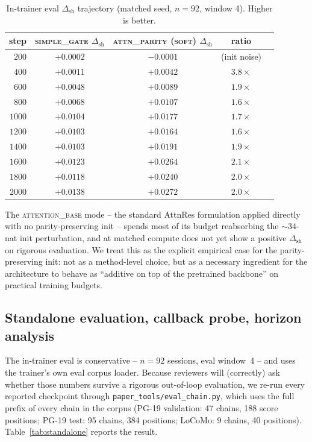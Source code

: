 \documentclass{article}
\newcommand{\dsh}{\Delta_{\text{sh}}}
\begin{document}
\begin{table}[t]
\centering
\caption{In-trainer eval $\dsh$ trajectory (matched seed, $n=92$,
window 4). Higher is better.}
\label{tab:headtohead_traj}
\begin{tabular}{rcccc}
\toprule
step & \textsc{simple\_gate} $\dsh$ & \textsc{attn\_parity (soft)} $\dsh$ & ratio \\
\midrule
$200$  & $+0.0002$ & $-0.0001$ & (init noise) \\
$400$  & $+0.0011$ & $+0.0042$ & $3.8\times$ \\
$600$  & $+0.0048$ & $+0.0089$ & $1.9\times$ \\
$800$  & $+0.0068$ & $+0.0107$ & $1.6\times$ \\
$1000$ & $+0.0104$ & $+0.0177$ & $1.7\times$ \\
$1200$ & $+0.0103$ & $+0.0164$ & $1.6\times$ \\
$1400$ & $+0.0103$ & $+0.0191$ & $1.9\times$ \\
$1600$ & $+0.0123$ & $+0.0264$ & $2.1\times$ \\
$1800$ & $+0.0118$ & $+0.0240$ & $2.0\times$ \\
$2000$ & $+0.0138$ & $\mathbf{+0.0272}$ & $2.0\times$ \\
\bottomrule
\end{tabular}
\end{table}

The \textsc{attention\_base} mode -- the standard AttnRes formulation
applied directly with no parity-preserving init -- spends most of its
budget reabsorbing the $\sim 34$-nat init perturbation, and at
matched compute does not yet show a positive $\dsh$ on rigorous
evaluation. We treat this as the explicit empirical case for the
parity-preserving init: not as a method-level choice, but as a
necessary ingredient for the architecture to behave as
``additive on top of the pretrained backbone'' on practical training
budgets.

\subsection{Standalone evaluation, callback probe, horizon analysis}
\label{sec:diagnostics}

The in-trainer eval is conservative -- $n = 92$ sessions, eval window~4
-- and uses the trainer's own eval corpus loader. Because reviewers
will (correctly) ask whether those numbers survive a rigorous
out-of-loop evaluation, we re-run every reported checkpoint through
\texttt{paper\_tools/eval\_chain.py}, which uses the full
prefix of every chain in the corpus (PG-19 validation: 47 chains,
188 score positions; PG-19 test: 95 chains, 384 positions; LoCoMo:
9 chains, 40 positions). Table~\ref{tab:standalone} reports the
result.
\end{document}
